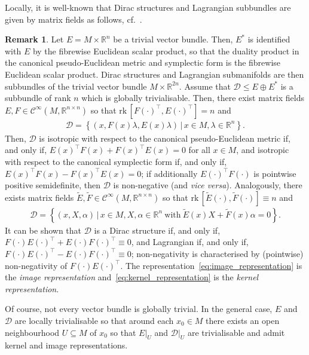 \documentclass[preprint,12pt]{elsarticle}
\theoremstyle{definition}
\newtheorem{remark}[theorem]{Remark}
\newcommand{\rk}{\mathrm{rk}\,}
\newcommand{\set}[1]{\left\lbrace #1\right\rbrace}
\begin{document}
Locally, it is well-known that Dirac structures and Lagrangian subbundles are given by matrix fields as follows, cf.~\cite{Cour90,SchaftJeltsema14}.

\begin{remark}\label{rem:local_reps}
Let $E = M\times\mathbb{R}^n$ be a trivial vector bundle. Then, $E^*$ is identified with $E$ by the fibrewise Euclidean scalar product, so that the duality product in the canonical pseudo-Euclidean metric and symplectic form is the fibrewise Euclidean scalar product. Dirac structures and Lagrangian submanifolds are then subbundles of the trivial vector bundle $M\times\mathbb{R}^{2n}$. Assume that $\mathcal{D}\leq E\oplus E^*$ is a subbundle of rank $n$ which is globally trivialisable. Then, there exist matrix fields $E,F\in\mathcal{C}^\infty(M,\mathbb{R}^{n\times n})$ so that $\rk [F(\cdot)^\top,E(\cdot)^\top] = n$ and
\begin{align}\label{eq:image_representation}
\mathcal{D} = \set{(x,F(x)\lambda,E(x)\lambda)\,\big\vert\,x\in M, \lambda\in\mathbb{R}^n}.
\end{align}
Then, $\mathcal{D}$ is isotropic with respect to the canonical pseudo-Euclidean metric if, and only if, $E(x)^\top F(x) + F(x)^\top E(x) = 0$ for all $x\in M$, and isotropic with respect to the canonical symplectic form if, and only if, $E(x)^\top F(x) - F(x)^\top E(x) = 0$; if additionally $E(\cdot)^\top F(\cdot)$ is pointwise positive semidefinite, then $\mathcal{D}$ is non-negative (and \textit{vice versa}).  Analogously, there exists matrix fields $\widetilde{E},\widetilde{F}\in\mathcal{C}^\infty(M,\mathbb{R}^{n\times n})$ so that $\rk [\widetilde{E}(\cdot),\widetilde{F}(\cdot)]\equiv n$ and
\begin{align}\label{eq:kernel_representation}
\mathcal{D} = \set{(x,X,\alpha)\,\big\vert\,x\in M, X,\alpha\in\mathbb{R}^n~\mathrm{with}~\widetilde{E}(x)X+\widetilde{F}(x)\alpha = 0}.
\end{align}
It can be shown that $\mathcal{D}$ is a Dirac structure if, and only if, $F(\cdot)E(\cdot)^\top + E(\cdot)F(\cdot)^\top \equiv 0$, and Lagrangian if, and only if, $F(\cdot)E(\cdot)^\top - E(\cdot)F(\cdot)^\top \equiv 0$; non-negativity is characterised by (pointwise) non-negativity of $F(\cdot)E(\cdot)^\top$. The representation~\eqref{eq:image_representation} is the \textit{image representation} and~\eqref{eq:kernel_representation} is the \textit{kernel representation}.

Of course, not every vector bundle is globally trivial. In the general case, $E$ and $\mathcal{D}$ are locally trivialisable so that around each $x_0\in M$ there exists an open neighbourhood $U\subseteq M$ of $x_0$ so that $E\vert_{U}$ and $\mathcal{D}\vert_U$ are trivialisable and admit kernel and image representations.
\end{remark}
\end{document}
